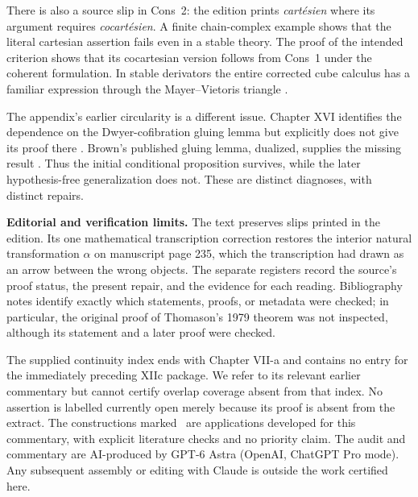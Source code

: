 There is also a source slip in Cons~2: the edition prints \emph{cart\'esien} where its argument requires \emph{cocart\'esien}. A finite chain-complex example shows that the literal cartesian assertion fails even in a stable theory. The proof of the intended criterion shows that its cocartesian version follows from Cons~1 under the coherent formulation. In stable derivators the entire corrected cube calculus has a familiar expression through the Mayer--Vietoris triangle \citep[Theorems~6.1 and 7.1, arXiv v2]{GrothPontoShulman2014}.

The appendix's earlier circularity is a different issue. Chapter XVI identifies the dependence on the Dwyer-cofibration gluing lemma but explicitly does not give its proof there \citep[\S3, ms.~pp.~18--23]{GrothendieckDerivateursXVI}. Brown's published gluing lemma, dualized, supplies the missing result \citep[Part~I, \S4, Lemma~2]{Brown1973}. Thus the initial conditional proposition survives, while the later hypothesis-free generalization does not. These are distinct diagnoses, with distinct repairs.

\medskip\noindent\textbf{Editorial and verification limits.}
The text preserves slips printed in the edition. Its one mathematical transcription correction restores the interior natural transformation $\alpha$ on manuscript page 235, which the transcription had drawn as an arrow between the wrong objects. The separate registers record the source's proof status, the present repair, and the evidence for each reading. Bibliography notes identify exactly which statements, proofs, or metadata were checked; in particular, the original proof of Thomason's 1979 theorem was not inspected, although its statement and a later proof were checked.

The supplied continuity index ends with Chapter VII-a and contains no entry for the immediately preceding XIIc package. We refer to its relevant earlier commentary but cannot certify overlap coverage absent from that index. No assertion is labelled currently open merely because its proof is absent from the extract. The constructions marked \ours\ are applications developed for this commentary, with explicit literature checks and no priority claim. The audit and commentary are AI-produced by GPT-6 Astra (OpenAI, ChatGPT Pro mode). Any subsequent assembly or editing with Claude is outside the work certified here.
\endgroup
